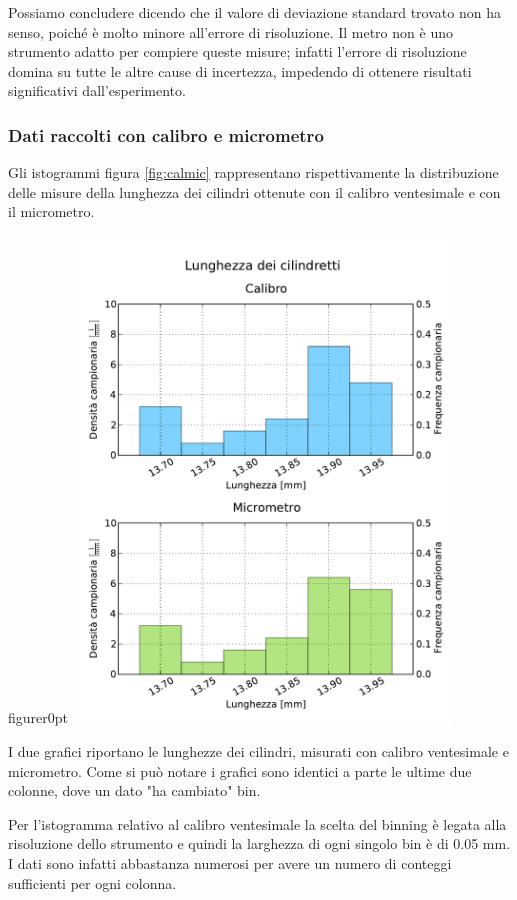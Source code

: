 Possiamo concludere dicendo che il valore di deviazione standard trovato non ha
senso, poiché è molto minore all'errore di risoluzione. Il metro non è
uno strumento adatto per compiere queste misure; infatti l'errore di risoluzione domina su
tutte le altre cause di incertezza, impedendo di ottenere risultati significativi
dall'esperimento.

\subsubsection{Dati raccolti con calibro e micrometro}

Gli istogrammi figura \ref{fig:calmic} rappresentano rispettivamente la distribuzione delle
misure della lunghezza dei cilindri ottenute con il calibro ventesimale e con
il micrometro.

\begin{wrapfloat}{figure}{r}{0pt}
	\centering
	\includegraphics[width=100mm]{grafici/Cilindretti_calibro_micrometro.pdf}
	\caption{I due grafici riportano le lunghezze dei cilindri, misurati con calibro
        ventesimale e micrometro. Come si può notare i grafici sono identici a parte
        le ultime due colonne, dove un dato "ha cambiato" bin.}
	\label{fig:calmic}
\end{wrapfloat}

Per l'istogramma relativo al calibro ventesimale la scelta del binning è legata
alla risoluzione dello strumento e quindi la larghezza di ogni singolo
bin è di 0.05 mm. I dati sono infatti abbastanza numerosi per avere un numero
di conteggi sufficienti per ogni colonna.

